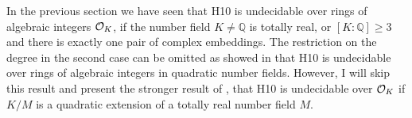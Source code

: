 
In the previous section we have seen that \textsc{H10} is undecidable over rings
of algebraic integers \(\mathcal{O}_{K}\), if the number field \(K ≠ ℚ\) is totally
real, or \([K : ℚ] ≥ 3\) and there is exactly one pair of complex embeddings.
The restriction on the degree in the second case can be omitted as
\textcite{Denef1975} showed in \citeyear{Denef1975} that \textsc{H10} is
undecidable over rings of algebraic integers in quadratic number fields.
However, I will skip this result and present the stronger result of
\textcite{Denef1978}, that \textsc{H10} is undecidable over \(\mathcal{O}_{K}\) if \(K /
M\) is a quadratic extension of a totally real number field \(M\).
